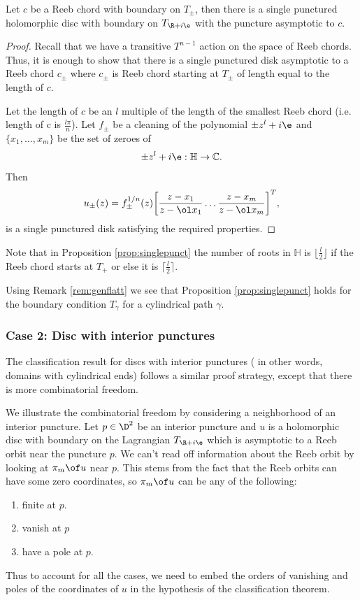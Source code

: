 \begin{prop}\label{prop:singlepunct}
    
    Let $c$ be a Reeb chord with boundary on $T_\pm $, then there is a single punctured holomorphic disc with boundary on $T_{\R + i\e}$ with the puncture asymptotic to $c$.
\end{prop}
\begin{proof}
    Recall that we have a transitive $T^{n-1}$ action on the space of Reeb chords. Thus, it is enough to show that there is a single punctured disk asymptotic to a Reeb chord $c_\pm$ where $c_\pm$ is Reeb chord starting at $T_\pm$ of length equal to the length of $c$.

    Let the length of $c$ be an $l$ multiple of the length of the smallest Reeb chord (i.e. length of c is $\frac{l\pi}{n}$). Let $f_\pm$ be a cleaning of the polynomial $\pm z^l + i\e$ and  $\{ x_1,\dots, x_{m} \}$ be the set of zeroes of $$\pm z^l + i\e : \mathbb{H} \to \mathbb{C} .$$ Then $$u_\pm(z) = f^{1/n}_\pm(z) \bigg[ \frac{z-x_1}{z-\ol x_1} \dots \frac{z-x_m}{z-\ol x_m} \bigg ] ^T,$$ is a single punctured disk satisfying the required properties.
\end{proof}


\begin{remark}
    Note that in Proposition \ref{prop:singlepunct} the number of roots in $\mathbb{H}$ is $\lfloor{\frac{l}{2}}\rfloor$ if the Reeb chord starts at $T_+$ or else it is $\lceil{\frac{l}{2}}\rceil$.
\end{remark}

\begin{remark}
    Using Remark  \ref{rem:genflatt} we see that Proposition \ref{prop:singlepunct} holds for the boundary condition $T_{\gamma}$ for a cylindrical path $\gamma$. 
\end{remark}


\subsubsection{Case 2: Disc with interior punctures}
The classification result for discs with interior punctures ( in other words, domains with cylindrical ends) follows a similar proof strategy, except that there is more combinatorial freedom.

We illustrate the combinatorial freedom by considering a neighborhood of an interior puncture. Let $p \in \D^2$ be an interior puncture and $u$ is a holomorphic disc with boundary on the Lagrangian $T_{\R+i\e}$ which is asymptotic to a Reeb orbit near the puncture $p$. We can't read off information about the Reeb orbit by looking at $\pi_m \of u $ near $p$. This stems from the fact that the Reeb orbits can have some zero coordinates, so $\pi_m \of u$ can be any of the following: \begin{enumerate}
    \item finite at $p$.
    \item  vanish at $p$
    \item have a pole at $p$.
\end{enumerate}
Thus to account for all the cases, we need to embed the orders of vanishing and poles of the coordinates of $u$ in the hypothesis of the classification theorem. 

